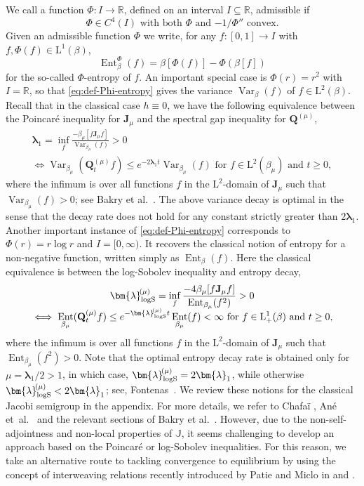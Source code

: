 \documentclass[10pt]{amsart}
\theoremstyle{plain}
\theoremstyle{definition}
\DeclareMathOperator{\Var}{Var}
\DeclareMathOperator{\Ent}{Ent}
\newcommand{\R}{\mathbb{R}}
\newcommand{\calJ}{\mathds{J}}
\newcommand{\Leb}{\mathrm{L}}
\newcommand{\calJd}{\mathbf{J}}
\newcommand{\lam}{{\bm{\lambda}_1}}
\newcommand{\logSob}[1][\mo]{\bm{\lambda}_{\mathrm{logS}}^{\hspace{-0.06cm}(#1)}}
\newcommand{\Q}[1][\mo]{\mathbf{Q}^{({#1})}}
\newcommand{\gab}[1][\lam,\mo]{{\beta_{#1}}}
\let\mo\mu
\let\bpsi\beta
\begin{document}
We call a function $\Phi:I \to \R$, defined on an interval $I \subseteq \R$, admissible if
\begin{equation}
\label{eq:def-admissible}
\text{$\Phi \in C^4(I)$ with both $\Phi$ and $-1/\Phi''$ convex.}
\end{equation}
Given an admissible function $\Phi$ we write, for any $f:[0,1] \to I$ with $f, \Phi(f) \in \Leb^1(\bpsi)$,
\begin{equation}
\label{eq:def-Phi-entropy}
\Ent_\bpsi^\Phi(f) = \bpsi[\Phi(f)] - \Phi(\bpsi [f])
\end{equation}
for the so-called $\Phi$-entropy of $f$. An important special case is $\Phi(r) = r^2$ with $I = \R$, so that \eqref{eq:def-Phi-entropy} gives the variance $\Var_\bpsi(f)$ of $f \in \Leb^2(\bpsi)$. Recall that in the classical case $h \equiv 0$, we have the following equivalence between the Poincaré inequality for $\calJd_\mo$ and the spectral gap inequality for $\Q$,
\begin{multline*}
\lam = \inf_f \frac{-\gab[\mo][f \calJd_\mo f]}{\Var_{\gab[\mo]}(f)} > 0\\[-5pt]
\iff \Var_{\gab[\mo]}(\Q_t f ) \leq e^{-2\lam t} \Var_{\gab[\mo]}(f) \text{ for } f \in \Leb^2(\gab[\mo]) \text{ and } t \geq 0,
\end{multline*}
where the infimum is over all functions $f$ in the $\Leb^2$-domain of $\calJd_\mo$ such that
\hbox{$\Var_{\gab[\mo]}(f) > 0$}; see \eg Bakry et al.~\cite[Chap.\,4.2]{Bakry_Book}. The above variance decay is optimal in the sense that the decay rate does not hold for any constant strictly greater than $2\lam$. Another important instance of \eqref{eq:def-Phi-entropy} corresponds to $\Phi(r)=r\log r$ and $I = [0, \infty)$. It recovers the classical notion of entropy for a non-negative function, written simply as $\Ent_\bpsi(f)$. Here the classical equivalence is between the log-Sobolev inequality and entropy decay,
\begin{multline*}
\logSob[\mo] = \inf_f \frac{-4\gab[\mo] [f \calJd_\mo f]}{\Ent_{\gab[\mo]} (f^2)} > 0\\[-5pt]
\iff \Ent_{\gab[\mo]} (\Q[\mo]_tf) \leq e^{-\logSob[\mo] t} \Ent_{\gab[\mo]} (f) < \infty \text{ for } f \in \Leb^1_+(\bpsi) \text{ and } t \geq 0,
\end{multline*}
where the infimum is over all functions $f$ in the $\Leb^2$-domain of $\calJd_\mo$ such that \hbox{$\Ent_{\gab[\mo]} (f^2) > 0$}.
Note that the optimal entropy decay rate is obtained only for $\mo = \lam/2 > 1$, in which case, $\logSob[\mo] = 2\lam$, while otherwise $\logSob[\mo] < 2\lam$; see, \eg Fontenas~\cite{fontenas:1998}. We review these notions for the classical Jacobi semigroup in the appendix. For more details, we refer to Chafaï \cite{chafai}, Ané et~al.~\cite{logSobolev-book} and the relevant sections of Bakry et al.~\cite{Bakry_Book}. However, due to the non-self-adjointness and non-local properties of $\calJ$, it seems challenging to develop an approach based on the Poincaré or log-Sobolev inequalities. For this reason, we take an alternative route to tackling convergence to equilibrium by using the concept of interweaving relations recently introduced by Patie and Miclo in \cite[\S 3.5]{Gateway} and \cite{Patie-Miclo}.
\end{document}
